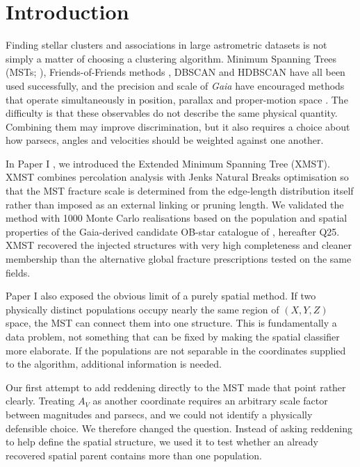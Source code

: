 \documentclass[fleqn,usenatbib]{rasti}
\begin{document}




\section{Introduction}

Finding stellar clusters and associations in large astrometric datasets is not simply a matter of choosing a clustering algorithm. Minimum Spanning Trees (MSTs; \citealt{Cartwright2004}), Friends-of-Friends methods \citep{Liu2019}, DBSCAN \citep{Ester1996} and HDBSCAN \citep{Campello2015} have all been used successfully, and the precision and scale of \textit{Gaia} have encouraged methods that operate simultaneously in position, parallax and proper-motion space \citep[e.g.][]{Kounkel2019,Hunt2021}. The difficulty is that these observables do not describe the same physical quantity. Combining them may improve discrimination, but it also requires a choice about how parsecs, angles and velocities should be weighted against one another.

In Paper I \citep{Gallaway2026XMST}, we introduced the Extended Minimum Spanning Tree (XMST). XMST combines percolation analysis with Jenks Natural Breaks optimisation so that the MST fracture scale is determined from the edge-length distribution itself rather than imposed as an external linking or pruning length. We validated the method with 1000 Monte Carlo realisations based on the population and spatial properties of the Gaia-derived candidate OB-star catalogue of \citet{Quintana2025}, hereafter Q25. XMST recovered the injected structures with very high completeness and cleaner membership than the alternative global fracture prescriptions tested on the same fields.

Paper I also exposed the obvious limit of a purely spatial method. If two physically distinct populations occupy nearly the same region of $(X,Y,Z)$ space, the MST can connect them into one structure. This is fundamentally a data problem, not something that can be fixed by making the spatial classifier more elaborate. If the populations are not separable in the coordinates supplied to the algorithm, additional information is needed.

Our first attempt to add reddening directly to the MST made that point rather clearly. Treating $A_V$ as another coordinate requires an arbitrary scale factor between magnitudes and parsecs, and we could not identify a physically defensible choice. We therefore changed the question. Instead of asking reddening to help define the spatial structure, we used it to test whether an already recovered spatial parent contains more than one population.
\end{document}
